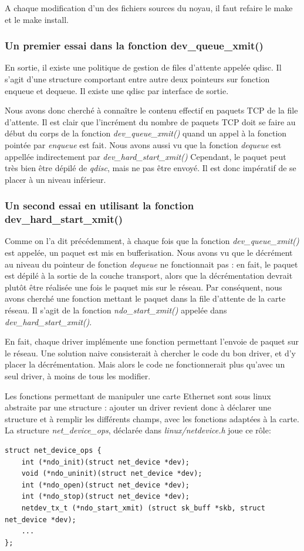 \documentclass[a4paper]{article}
\begin{document}
A chaque modification d'un des fichiers sources du noyau, il faut refaire le make et le make install.

\subsubsection{Un premier essai dans la fonction dev\_queue\_xmit()}
En sortie, il existe une politique de gestion de files d'attente appelée qdisc.
Il s'agit d'une structure  comportant entre autre deux pointeurs sur fonction
enqueue et dequeue. Il existe une qdisc par interface de sortie.

Nous avons donc cherché à connaître le contenu effectif en paquets TCP de
la file d'attente. Il est clair que l'incrément du nombre de paquets TCP
doit se faire au début du corps de la fonction \textit{dev\_queue\_xmit()}
quand un appel à la fonction pointée par \textit{enqueue} est fait. Nous
avons aussi vu que la fonction \textit{dequeue} est appellée indirectement
par \textit{dev\_hard\_start\_xmit()} 
Cependant, le paquet peut très bien être dépilé de \textit{qdisc}, mais ne pas
être envoyé. Il est donc impératif de se placer à un niveau inférieur.

\subsubsection{Un second essai en utilisant la fonction dev\_hard\_start\_xmit()}

Comme on l'a dit précédemment, à chaque fois que la fonction \textit{dev\_queue\_xmit()}
est appelée, un paquet est mis en bufferisation. Nous avons vu que le décrément au
niveau du pointeur de fonction \textit{dequeue} ne fonctionnait pas : en fait,
le paquet est dépilé à la sortie de la couche transport, alors que la décrémentation
devrait plutôt être réalisée une fois le paquet mis sur le réseau. Par 
conséquent, nous avons cherché une fonction mettant le paquet dans la file
d'attente de la carte réseau. Il s'agit de la fonction \textit{ndo\_start\_xmit()}
appelée dans \textit{dev\_hard\_start\_xmit()}. 

En fait, chaque driver implémente une fonction permettant l'envoie de
paquet sur le réseau. Une solution naive consisterait à chercher le
code du bon driver, et d'y placer la décrémentation. Mais alors le
code ne fonctionnerait plus qu'avec un seul driver, à moins de tous
les modifier.

Les fonctions permettant de manipuler une carte Ethernet sont sous
linux abstraite par une structure : ajouter un driver revient donc
à déclarer une structure et à remplir les différents champs, avec
les fonctions adaptées à la carte.
La structure \textit{net\_device\_ops}, déclarée dans
\textit{linux/netdevice.h} joue ce rôle:
\begin{verbatim}
struct net_device_ops {
    int (*ndo_init)(struct net_device *dev);
    void (*ndo_uninit)(struct net_device *dev);
    int (*ndo_open)(struct net_device *dev);
    int (*ndo_stop)(struct net_device *dev);
    netdev_tx_t (*ndo_start_xmit) (struct sk_buff *skb, struct net_device *dev);
    ...
};
\end{verbatim}
\end{document}
